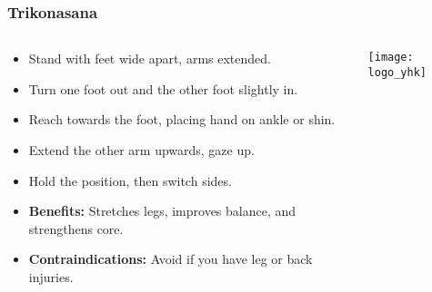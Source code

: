 \begin{frame}[fragile]\frametitle{Trikonasana}
\begin{columns}
    \begin{column}[T]{0.5\linewidth}
      \begin{itemize}
        \item Stand with feet wide apart, arms extended.
        \item Turn one foot out and the other foot slightly in.
        \item Reach towards the foot, placing hand on ankle or shin.
        \item Extend the other arm upwards, gaze up.
        \item Hold the position, then switch sides.
        \item \textbf{Benefits:} Stretches legs, improves balance, and strengthens core.
        \item \textbf{Contraindications:} Avoid if you have leg or back injuries.
      \end{itemize}
    \end{column}
    \begin{column}[T]{0.5\linewidth}
        \begin{center}
        \texttt{[image: logo\_yhk]}
        \end{center}    
    \end{column}
  \end{columns}
\end{frame}

